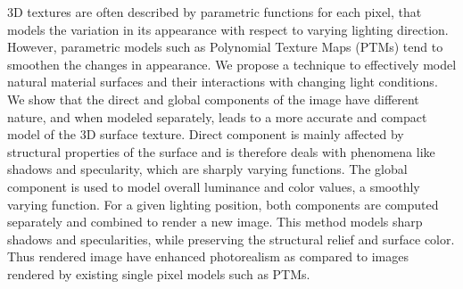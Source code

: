 
3D textures are often described by parametric functions for each pixel, that
models the variation in its appearance with respect to varying lighting
direction. However, parametric models such as Polynomial Texture Maps (PTMs)
tend to smoothen the changes in appearance. We propose a technique to
effectively model natural material surfaces and their interactions with changing
light conditions. We show that the direct and global components of the image
have different nature, and when modeled separately, leads to a more accurate and
compact model of the 3D surface texture. Direct component is mainly affected by
structural properties of the surface and is therefore deals with phenomena like
shadows and specularity, which are sharply varying functions. The global
component is used to model overall luminance and color values, a smoothly
varying function. For a given lighting position, both components are computed
separately and combined to render a new image. This method models sharp shadows
and specularities, while preserving the structural relief and surface color.
Thus rendered image have enhanced photorealism as compared to images rendered by
existing single pixel models such as PTMs.